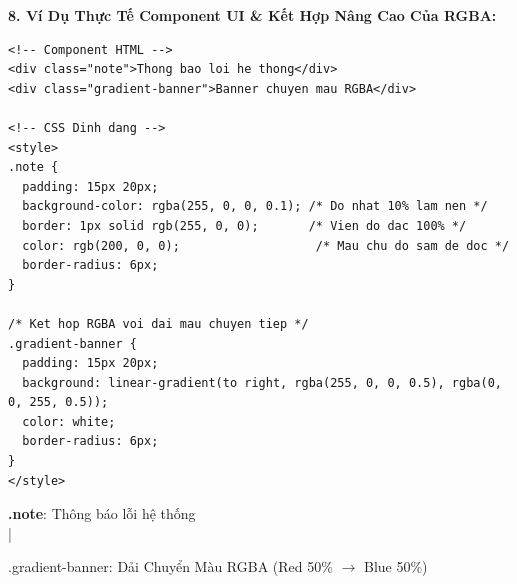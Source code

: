 \textbf{8. Ví Dụ Thực Tế Component UI \& Kết Hợp Nâng Cao Của RGBA:}

\begin{codeWindow}
\begin{lstlisting}[language=HTML5]
<!-- Component HTML -->
<div class="note">Thong bao loi he thong</div>
<div class="gradient-banner">Banner chuyen mau RGBA</div>

<!-- CSS Dinh dang -->
<style>
.note {
  padding: 15px 20px;
  background-color: rgba(255, 0, 0, 0.1); /* Do nhat 10% lam nen */
  border: 1px solid rgb(255, 0, 0);       /* Vien do dac 100% */
  color: rgb(200, 0, 0);                   /* Mau chu do sam de doc */
  border-radius: 6px;
}

/* Ket hop RGBA voi dai mau chuyen tiep */
.gradient-banner {
  padding: 15px 20px;
  background: linear-gradient(to right, rgba(255, 0, 0, 0.5), rgba(0, 0, 255, 0.5));
  color: white;
  border-radius: 6px;
}
</style>
\end{lstlisting}
\end{codeWindow}

\begin{browserWindow}
\vspace{2pt}
\begin{tcolorbox}[
    enhanced,
    colback=red!8,
    colframe=red!80!black,
    arc=5pt, boxrule=0.8pt,
    top=8pt, bottom=8pt, left=12pt, right=12pt,
    fontupper=\sffamily\color{red!80!black}
]
  \textbf{.note}: Thông báo lỗi hệ thống\\
  {\small{} \quad|\quad {}}
\end{tcolorbox}

\vspace{4pt}

\begin{tcolorbox}[
    enhanced,
    interior style={left color=red!60, right color=blue!60},
    colframe=primaryBlue!40,
    arc=5pt, boxrule=0.6pt,
    top=8pt, bottom=8pt, left=12pt, right=12pt,
    fontupper=\sffamily\bfseries\color{white}
]
  \centering
  .gradient-banner: Dải Chuyển Màu RGBA (Red 50\% $\rightarrow$ Blue 50\%)\\
  {\small\normalfont\color{white!95}}
\end{tcolorbox}
\end{browserWindow}

